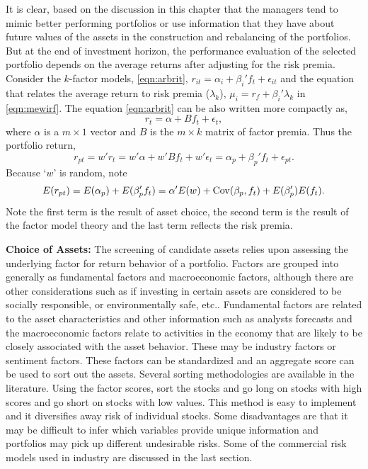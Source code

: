 It is clear, based on the discussion in this chapter that the managers tend to mimic better performing portfolios or use information that they have about future values of the assets in the construction and rebalancing of the portfolios. But at the end of investment horizon, the performance evaluation of the selected portfolio depends on the average returns after adjusting for the risk premia. Consider the $k$-factor models, \eqref{eqn:arbrit}, $r_{it}= \alpha_i + \beta_i' f_t + \epsilon_{it}$ and the equation that relates the average return to risk premia ($\lambda_k$), $\mu_i=r_f + \beta_i' \lambda_k$ in \eqref{eqn:mewirf}. The equation \eqref{eqn:arbrit} can be also written more compactly as,
	\begin{equation} \label{eqn:compactarb}
	r_t= \alpha + B f_t + \epsilon_t,
	\end{equation}
where $\alpha$ is a $m \times 1$ vector and $B$ is the $m \times k$ matrix of factor premia. Thus the portfolio return,
	\begin{equation} \label{eqn:portreturn1}
	r_{pt}= w'r_t = w' \alpha+ w'B f_t + w' \epsilon_t= \alpha_p + \beta_p' f_t + \epsilon_{pt}.
	\end{equation}
Because `$w$' is random, note
	\begin{equation} \label{eqn:portreturnrandom}
	E(r_{pt})= E(\alpha_p) + E(\beta_p' f_t)= \alpha' E(w)+ \cov(\beta_p,f_t) + E(\beta_p') E(f_t).
	\end{equation}
Note the first term is the result of asset choice, the second term is the result of the factor model theory and the last term reflects the risk premia. \twomedskip


\noindent\textbf{Choice of Assets:} The screening of candidate assets relies upon assessing the underlying factor for return behavior of a portfolio. Factors are grouped into generally as fundamental factors and macroeconomic factors, although there are other considerations such as if investing in certain assets are considered to be socially responsible, or environmentally safe, etc.. Fundamental factors are related to the asset characteristics and other information such as analysts forecasts and the macroeconomic factors relate to activities in the economy that are likely to be closely associated with the asset behavior. These may be industry factors or sentiment factors. These factors can be standardized and an aggregate score can be used to sort out the assets. Several sorting methodologies are available in the literature. Using the factor scores, sort the stocks and go long on stocks with high scores and go short on stocks with low values. This method is easy to implement and it diversifies away risk of individual stocks. Some disadvantages are that it may be difficult to infer which variables provide unique information and portfolios may pick up different undesirable risks. Some of the commercial risk models used in industry are discussed in the last section.


